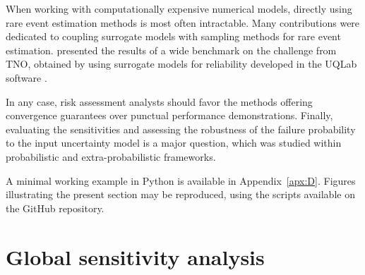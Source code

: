 
When working with computationally expensive numerical models, directly using rare event estimation methods is most often intractable. 
Many contributions were dedicated to coupling surrogate models with sampling methods for rare event estimation. 
\citet{moustapha_ss_2022} presented the results of a wide benchmark on the challenge from TNO, obtained by using surrogate models for reliability developed in the UQLab software \citep{marelli_2014_uqlab}.  

In any case, risk assessment analysts should favor the methods offering convergence guarantees over punctual performance demonstrations. 
Finally, evaluating the sensitivities and assessing the robustness of the failure probability to the input uncertainty model is a major question, which was studied within probabilistic \citep{lemaitre_2015_PLI,chabridon_2017,chabridon_2018_thesis,chabridon2021global} and extra-probabilistic \citep{ajenjo_2022_structural_safety,ajenjo_2023} frameworks. 


\begin{otexample}
    A minimal working example in Python is available in Appendix~\ref{apx:D}. 
    Figures illustrating the present section may be reproduced, using the \ots scripts available on the GitHub repository\footnotemark.  
\end{otexample}



\section{Global sensitivity analysis} \label{sec:gsa}

